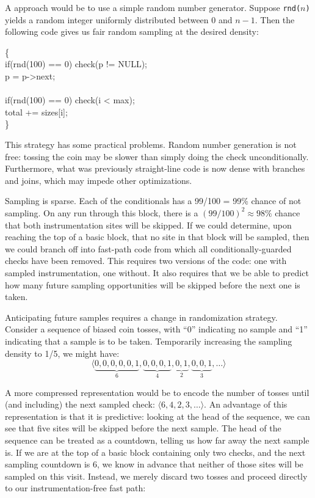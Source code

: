 A \naive approach would be to use a simple random number generator.
Suppose \texttt{rnd($n$)} yields a random integer uniformly
distributed between 0 and $n-1$.  Then the following code gives us
fair random sampling at the desired density:

\begin{code}
  \{\+ \\
  if(rnd(100) == 0) check(p != NULL); \\
  \up p = p->next; \\
  \\
  if(rnd(100) == 0) check(i < max); \\
  \up total += sizes[i]; \\
  \<\}
\end{code}

This strategy has some practical problems.  Random number generation
is not free: tossing the coin may be slower than simply doing the
check unconditionally.  Furthermore, what was previously straight-line
code is now dense with branches and joins, which may impede other
optimizations.

Sampling is sparse.  Each of the conditionals has a 99/100 = 99\%
chance of not sampling.  On any run through this block, there is a
$(99/100)^2 \approx 98\%$ chance that both instrumentation sites will
be skipped.  If we could determine, upon reaching the top of a basic
block, that no site in that block will be sampled, then we could
branch off into fast-path code from which all conditionally-guarded
checks have been removed.  This requires two versions of the code: one
with sampled instrumentation, one without.  It also requires that we
be able to predict how many future sampling opportunities will be
skipped before the next one is taken.

Anticipating future samples requires a change in randomization
strategy.  Consider a sequence of biased coin tosses, with ``0''
indicating no sample and ``1'' indicating that a sample is to be
taken.  Temporarily increasing the sampling density to 1/5, we might
have:
\begin{equation*}
  \langle
  \underbrace{0, 0, 0, 0, 0, 1}_6,
  \underbrace{0, 0, 0, 1}_4,
  \underbrace{0, 1}_2,
  \underbrace{0, 0, 1}_3,
  \dots
  \rangle
\end{equation*}

A more compressed representation would be to encode the number of
tosses until (and including) the next sampled check: $\langle6, 4, 2, 3,
\dots\rangle$.  An advantage of this representation is that it is
predictive: looking at the head of the sequence, we can see that five
sites will be skipped before the next sample.  The head of the
sequence can be treated as a countdown, telling us how far away the
next sample is.  If we are at the top of a basic block containing only
two checks, and the next sampling countdown is 6, we know in advance
that neither of those sites will be sampled on this visit.  Instead,
we merely discard two tosses and proceed directly to our
instrumentation-free fast path:


